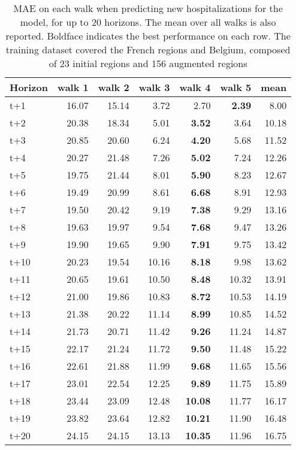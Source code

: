 \begin{table}[H]
\centering
\caption{MAE on each walk when predicting new hospitalizations for the model, for up to 20 horizons. The mean over all walks is also reported. Boldface indicates the best performance on each row. The training dataset covered the French regions and Belgium, composed of 23 initial regions and 156 augmented regions }
\label{tab:MAE_walk_encoder_decoder}
\begin{tabular}{lrrrrrr}
\toprule
Horizon &  walk 1 &  walk 2 &  walk 3 &  walk 4 &  walk 5 &  mean \\
\midrule
t+1  & 16.07  & 15.14  & 3.72  & 2.70  & \textbf{2.39}  & 8.00  \\
t+2  & 20.38  & 18.34  & 5.01  & \textbf{3.52}  & 3.64  & 10.18  \\
t+3  & 20.85  & 20.60  & 6.24  & \textbf{4.20}  & 5.68  & 11.52  \\
t+4  & 20.27  & 21.48  & 7.26  & \textbf{5.02}  & 7.24  & 12.26  \\
t+5  & 19.75  & 21.44  & 8.01  & \textbf{5.90}  & 8.23  & 12.67  \\
t+6  & 19.49  & 20.99  & 8.61  & \textbf{6.68}  & 8.91  & 12.93  \\
t+7  & 19.50  & 20.42  & 9.19  & \textbf{7.38}  & 9.29  & 13.16  \\
t+8  & 19.63  & 19.97  & 9.54  & \textbf{7.68}  & 9.47  & 13.26  \\
t+9  & 19.90  & 19.65  & 9.90  & \textbf{7.91}  & 9.75  & 13.42  \\
t+10  & 20.23  & 19.54  & 10.16  & \textbf{8.18}  & 9.98  & 13.62  \\
t+11  & 20.65  & 19.61  & 10.50  & \textbf{8.48}  & 10.32  & 13.91  \\
t+12  & 21.00  & 19.86  & 10.83  & \textbf{8.72}  & 10.53  & 14.19  \\
t+13  & 21.38  & 20.22  & 11.14  & \textbf{8.99}  & 10.85  & 14.52  \\
t+14  & 21.73  & 20.71  & 11.42  & \textbf{9.26}  & 11.24  & 14.87  \\
t+15  & 22.17  & 21.24  & 11.72  & \textbf{9.50}  & 11.48  & 15.22  \\
t+16  & 22.61  & 21.88  & 11.99  & \textbf{9.68}  & 11.65  & 15.56  \\
t+17  & 23.01  & 22.54  & 12.25  & \textbf{9.89}  & 11.75  & 15.89  \\
t+18  & 23.44  & 23.09  & 12.48  & \textbf{10.08}  & 11.77  & 16.17  \\
t+19  & 23.82  & 23.64  & 12.82  & \textbf{10.21}  & 11.90  & 16.48  \\
t+20  & 24.15  & 24.15  & 13.13  & \textbf{10.35}  & 11.96  & 16.75  \\

\bottomrule
\end{tabular}
\end{table}
